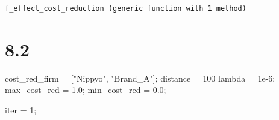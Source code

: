 \documentclass[
  letterpaper,
  DIV=11,
  numbers=noendperiod]{scrreprt}
\newenvironment{Shaded}{\begin{snugshade}}{\end{snugshade}}
\newcommand{\FloatTok}[1]{\textcolor[rgb]{0.68,0.00,0.00}{#1}}
\newcommand{\NormalTok}[1]{\textcolor[rgb]{0.00,0.23,0.31}{#1}}
\newcommand{\OperatorTok}[1]{\textcolor[rgb]{0.37,0.37,0.37}{#1}}
\newcommand{\StringTok}[1]{\textcolor[rgb]{0.13,0.47,0.30}{#1}}
\begin{document}
\begin{verbatim}
f_effect_cost_reduction (generic function with 1 method)
\end{verbatim}

\hypertarget{section-18}{%
\section{8.2}\label{section-18}}

\begin{Shaded}
\begin{Highlighting}[]
\NormalTok{cost\_red\_firm }\OperatorTok{=}\NormalTok{ [}\StringTok{"Nippyo"}\NormalTok{, }\StringTok{"Brand\_A"}\NormalTok{];}
\NormalTok{distance }\OperatorTok{=} \FloatTok{100}
\NormalTok{lambda }\OperatorTok{=} \FloatTok{1e{-}6}\NormalTok{;}
\NormalTok{max\_cost\_red }\OperatorTok{=} \FloatTok{1.0}\NormalTok{;}
\NormalTok{min\_cost\_red }\OperatorTok{=} \FloatTok{0.0}\NormalTok{;}

\NormalTok{iter }\OperatorTok{=} \FloatTok{1}\NormalTok{;}
\end{Highlighting}
\end{Shaded}
\end{document}
